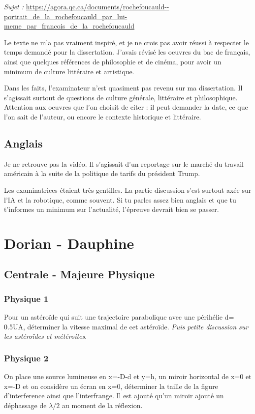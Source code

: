 \documentclass[11pt,a4paper]{article}
\begin{document}
\textit{Sujet :} \url{https://agora.qc.ca/documents/rochefoucauld--portrait_de_la_rochefoucauld_par_lui-meme_par_francois_de_la_rochefoucauld}

Le texte ne m'a pas vraiment inspiré, et je ne crois pas avoir réussi à respecter le temps demandé pour la dissertation.
J'avais révisé les oeuvres du bac de français, ainsi que quelques références de philosophie et de cinéma, pour avoir un minimum de culture littéraire et artistique.

Dans les faits, l'examinateur n'est quasiment pas revenu sur ma dissertation. Il s'agissait surtout de questions de culture générale, littéraire et philosophique.
Attention aux oeuvres que l'on choisit de citer : il peut demander la date, ce que l'on sait de l'auteur, ou encore le contexte historique et littéraire.

\subsection{Anglais}

Je ne retrouve pas la vidéo. Il s'agissait d'un reportage sur le marché du travail américain à la suite de la politique de tarifs du président Trump.

Les examinatrices étaient très gentilles. La partie discussion s'est surtout axée sur l'IA et la robotique, comme souvent. Si tu parles assez bien anglais et que tu t'informes un minimum sur l'actualité, l'épreuve devrait bien se passer.


\section{Dorian - Dauphine}

\subsection{Centrale - Majeure Physique}

\subsubsection{Physique 1}
Pour un astéroïde qui suit une trajectoire parabolique avec une périhélie d= 0.5UA, déterminer la vitesse maximal de cet astéroïde.
\textit{Puis petite discussion sur les astéroïdes et météroites}.

\subsubsection{Physique 2}
On place une source lumineuse en x=-D-d et y=h, un miroir horizontal de x=0 et x=-D et on considère un écran en x=0, déterminer la taille de la figure d'interference ainsi que l'interfrange. Il est ajouté qu'un miroir ajouté un déphassage de $\lambda/2$ au moment de la réflexion.
\end{document}
